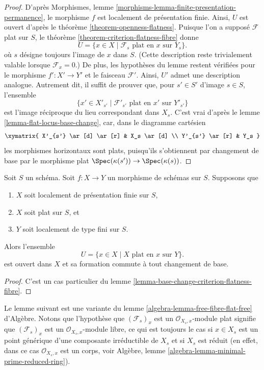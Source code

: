 \begin{proof}
D'après
Morphismes, lemme \ref{morphisms-lemma-finite-presentation-permanence},
le morphisme $f$ est localement de présentation finie.
Ainsi, $U$ est ouvert d'après le
théorème \ref{theorem-openness-flatness}.
Puisque l'on a supposé $\mathcal{F}$ plat sur $S$, le
théorème \ref{theorem-criterion-flatness-fibre}
donne
$$
U = \{x \in X \mid \mathcal{F}_s \text{ plat en }x \text{ sur }Y_s\}.
$$
où $s$ désigne toujours l'image de $x$ dans $S$. (Cette description
reste trivialement valable lorsque $\mathcal{F}_x = 0$.) De plus, les hypothèses
du lemme restent vérifiées pour le morphisme $f' : X' \to Y'$
et le faisceau $\mathcal{F}'$. Ainsi, $U'$ admet une description analogue.
Autrement dit, il suffit de prouver que, pour
$s' \in S'$ d'image $s \in S$, l'ensemble
$$
\{x' \in X'_{s'} \mid
\mathcal{F}'_{s'} \text{ plat en }x' \text{ sur }Y'_{s'}\}
$$
est l'image réciproque du lieu correspondant dans $X_s$.
C'est vrai d'après le
lemme \ref{lemma-flat-locus-base-change},
car, dans le diagramme cartésien
$$
\xymatrix{
X'_{s'} \ar[d] \ar[r] & X_s \ar[d] \\
Y'_{s'} \ar[r] & Y_s
}
$$
les morphismes horizontaux sont plats, puisqu'ils s'obtiennent par changement de
base par le morphisme plat $\Spec(\kappa(s')) \to \Spec(\kappa(s))$.
\end{proof}

\begin{lemma}
\label{lemma-base-change-flatness-fibres}
Soit $S$ un schéma. Soit $f : X \to Y$ un morphisme de schémas sur $S$.
Supposons que
\begin{enumerate}
\item $X$ soit localement de présentation finie sur $S$,
\item $X$ soit plat sur $S$, et
\item $Y$ soit localement de type fini sur $S$.
\end{enumerate}
Alors l'ensemble
$$
U = \{x \in X \mid X\text{ plat en }x \text{ sur }Y\}.
$$
est ouvert dans $X$ et sa formation commute à tout changement de base.
\end{lemma}

\begin{proof}
C'est un cas particulier du
lemme \ref{lemma-base-change-criterion-flatness-fibre}.
\end{proof}

\noindent
Le lemme suivant est une variante du
lemme \ref{algebra-lemma-free-fibre-flat-free} d'Algèbre.
Notons que l'hypothèse
que $(\mathcal{F}_s)_x$ est un $\mathcal{O}_{X_s, x}$-module plat
signifie que $(\mathcal{F}_s)_x$ est un $\mathcal{O}_{X_s, x}$-module libre,
ce qui est toujours le cas si $x \in X_s$ est un point générique d'une
composante irréductible de $X_s$ et si $X_s$ est réduit (en effet,
dans ce cas $\mathcal{O}_{X_s, x}$ est un corps, voir
Algèbre, lemme \ref{algebra-lemma-minimal-prime-reduced-ring}).

